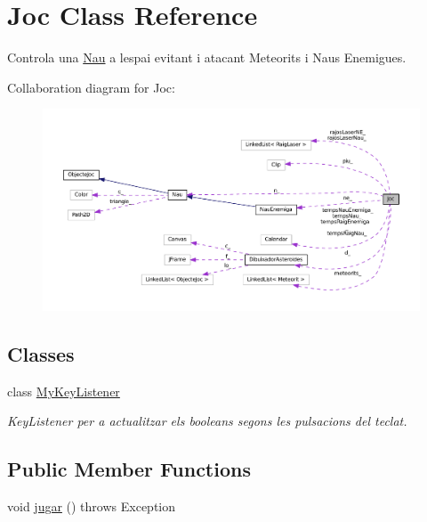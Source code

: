 \hypertarget{class_joc}{}\section{Joc Class Reference}
\label{class_joc}


Controla una \hyperlink{class_nau}{Nau} a l\textquotesingle{}espai evitant i atacant Meteorits i Naus Enemigues.  




Collaboration diagram for Joc\+:
\nopagebreak
\begin{figure}[H]
\begin{center}
\leavevmode
\includegraphics[width=350pt]{class_joc__coll__graph}
\end{center}
\end{figure}
\subsection*{Classes}
\begin{DoxyCompactItemize}
\item 
class \hyperlink{class_joc_1_1_my_key_listener}{My\+Key\+Listener}
\begin{DoxyCompactList}\small\item\em Key\+Listener per a actualitzar els booleans segons les pulsacions del teclat. \end{DoxyCompactList}\end{DoxyCompactItemize}
\subsection*{Public Member Functions}
\begin{DoxyCompactItemize}
\item 
void \hyperlink{class_joc_aa5da4464cac2dc81f26430ac16fa7029}{jugar} ()  throws Exception 
\end{DoxyCompactItemize}
